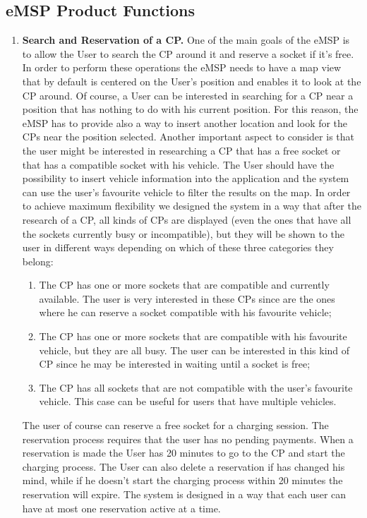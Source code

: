 \documentclass{Configuration_Files/PoliMi3i_thesis}
\begin{document}
\subsection{eMSP Product Functions}
\begin{enumerate}
     \item \textbf{Search and Reservation of a CP.} \newline
    One of the main goals of the eMSP is to allow the User to search the CP around it and reserve a socket if it's free. In order to perform these operations the eMSP needs to have a map view that by default is centered on the User's position and enables it to look at the CP around. Of course, a User can be interested in searching for a CP near a position that has nothing to do with his current position. For this reason, the eMSP has to provide also a way to insert another location and look for the CPs near the position selected. Another important aspect to consider is that the user might be interested in researching a CP that has a free socket or that has a compatible socket with his vehicle.
    The User should have the possibility to insert vehicle information into the application and the system can use the user’s favourite vehicle to filter the results on the map.
    In order to achieve maximum flexibility we designed the system in a way that after the research of a CP, all kinds of CPs are displayed (even the ones that have all the sockets currently busy or incompatible), but they will be shown to the user in different ways depending on which of these three categories they belong: 
    \begin{enumerate}
        \item The CP has one or more sockets that are compatible and currently available. The user is very interested in these CPs since are the ones where he can reserve a socket compatible with his favourite vehicle;
        \item The CP has one or more sockets that are compatible with his favourite vehicle, but they are all busy. The user can be interested in this kind of CP since he may be interested in waiting until a socket is free;
        \item The CP has all sockets that are not compatible with the user’s favourite vehicle. This case can be useful for users that have multiple vehicles.
    \end{enumerate}
    
    The user of course can reserve a free socket for a charging session. The reservation process requires that the user has no pending payments. When a reservation is made the User has 20 minutes to go to the CP and start the charging process. 
    The User can also delete a reservation if has changed his mind, while if he doesn’t start the charging process within 20 minutes the reservation will expire. The system is designed in a way that each user can have at most one reservation active at a time. \newline
   

\end{enumerate}
\end{document}
